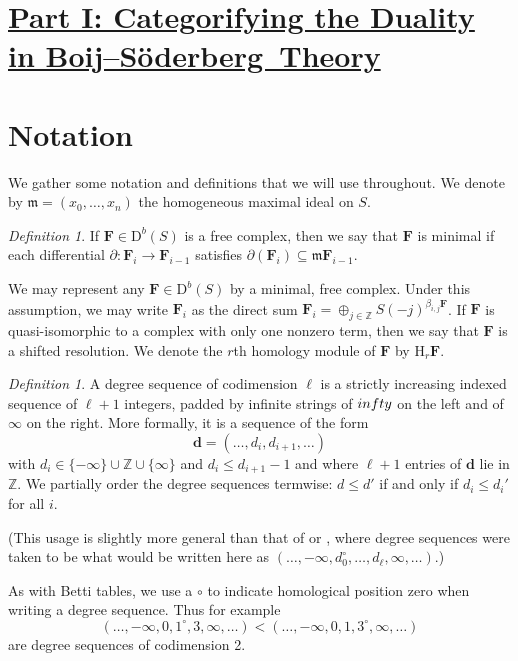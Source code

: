 \documentclass[12pt]{amsart}
\theoremstyle{definition}
\theoremstyle{remark}
\newtheorem{defn}[lemma]{Definition}
\newcommand{\HH}{\mathrm{H}}
\newcommand{\ZZ}{\mathbb{Z}}
\newcommand{\dd}{\mathbf{d}}
\newcommand{\FF}{\mathbf{F}}
\newcommand{\defi}[1]{\textsf{#1}} %
\newcommand{\zp}{\circ}
\newcommand{\DD}{\mathrm{D}}
\def\BS{Boij--S\"oderberg~}
\begin{document}
\section*{\underline{{Part I: Categorifying the Duality in \BS Theory}}}
\section{Notation}\label{sec:notation}
We gather some notation and definitions that we will use throughout.  We denote by  $\mathfrak m=(x_0, \dots, x_n)$ the homogeneous maximal ideal on $S$.
\begin{defn}
If $\FF\in \DD^b(S)$ is a free complex, then we say that $\FF$ is \defi{minimal} if each differential $\partial: \FF_i\to \FF_{i-1}$ satisfies $\partial(\FF_i)\subseteq \mathfrak m\FF_{i-1}$.
\end{defn}
We may represent any $\FF\in \DD^b(S)$ by a minimal, free complex.  Under this assumption, we may write $\FF_i$ as the direct sum $\FF_i=\oplus_{j\in \ZZ} S(-j)^{\beta_{i,j}\FF}$.  If $\FF$ is quasi-isomorphic to a complex with only one nonzero term, then we say that $\FF$ is a \defi{shifted resolution}.  We denote the $r$th homology module of $\FF$ by $\HH_r\FF$.

\begin{defn}\label{def:deg seq}
A \defi{ degree sequence of codimension $\ell$} is a strictly increasing indexed sequence of $\ell+1$ 
integers, padded by  infinite strings of $\-infty$ on the left and of $\infty$ on the right. More formally,
it is a sequence of the form
\[{\dd}=(\dots, d_i, d_{i+1}, \dots)
\]
with  $d_{i} \in \{-\infty\}\cup \ZZ\cup \{\infty\}$ and $d_i \leq d_{i+1}-1$ and 
where  $\ell+1$ entries of $\dd$ lie in $\ZZ$. 
We partially order the degree sequences  termwise: $d\leq d'$ if and only if $d_i\leq d_i'$ for all $i$.
\end{defn}
(This usage is slightly more general than that of \cite{eis-schrey1} or \cite{boij-sod2}, where degree
sequences were taken to be what would be written here as
$(\dots,-\infty,d_{0}^{\zp},\dots,d_{\ell}, \infty,\dots)$.)

As with Betti tables, we use a $\zp$ to indicate homological position zero when writing a degree sequence. 
Thus for example
$$
(\dots, -\infty , 0, 1^{\circ}, 3, \infty, \dots) < (\dots, -\infty , 0, 1, 3^{\circ}, \infty, \dots) 
$$
are  degree sequences of codimension 2.
\end{document}

